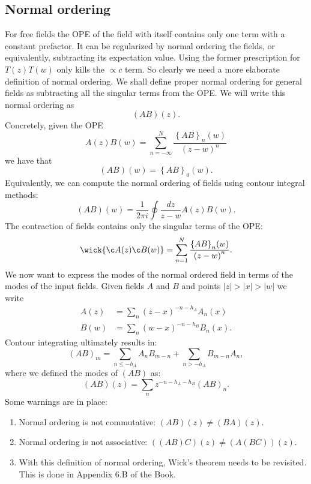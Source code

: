 \documentclass[submission, PhysLectNotes]{SciPost}
\begin{document}
\subsection{Normal ordering}
For free fields the OPE of the field with itself contains only one term with a constant prefactor. It can be regularized by normal ordering the fields, or equivalently, subtracting its expectation value.
Using the former prescription for $T(z)T(w)$ only kills the $\propto c$ term. So clearly we need a more elaborate definition of normal ordering. We shall define proper normal ordering for general fields as subtracting all the singular terms from the OPE\@. We will write this normal ordering as
\begin{equation}
	(AB)(z).
\end{equation}
Concretely, given the OPE
\begin{equation}
	A(z)B(w) = \sum_{n=-\infty}^{N}\frac{{\left\{AB\right\}}_n(w)}{{(z-w)}^n}
\end{equation}
we have that
\begin{equation}
	(AB)(w) = {\left\{AB\right\}}_0(w).
\end{equation}
Equivalently, we can compute the normal ordering of fields using contour integral methods:
\begin{equation}
	(AB)(w) = \frac{1}{2\pi i}\oint \frac{dz}{z-w}A(z)B(w).
\end{equation}
The contraction of fields contains only the singular terms of the OPE\@:
\begin{equation}
	\wick{\c A(z) \c B(w)} = \sum_{n=1}^N\frac{{\left\{AB\right\}}_n(w)}{{(z-w)}^n}.
\end{equation}
We now want to express the modes of the normal ordered field in terms of the modes of the input fields. Given fields $A$ and $B$ and points $|z|>|x|>|w|$ we write
\begin{subequations}
\begin{align}
	A(z) &= \sum_n {(z-x)}^{-n-h_A}A_n(x) \\
	B(w) &= \sum_n {(w-x)}^{-n-h_B}B_n(x).
\end{align}
\end{subequations}
Contour integrating ultimately results in:
\begin{equation}
	{(AB)}_m = \sum_{n\leq -h_A} A_n B_{m-n} + \sum_{n>-h_A}B_{m-n}A_n,
\end{equation}
where we defined the modes of $(AB)$ as:
\begin{equation}
	{(AB)}(z) = \sum_n z^{-n-h_A-h_B}{(AB)}_n.
\end{equation}
Some warnings are in place:
\begin{enumerate}
	\item Normal ordering is not commutative: $(AB)(z) \neq (BA)(z)$.
	\item Normal ordering is not associative: $((AB)C)(z)\neq(A(BC))(z)$.
	\item With this definition of normal ordering, Wick's theorem needs to be revisited. This is done in Appendix 6.B of the Book.
\end{enumerate}
\end{document}
